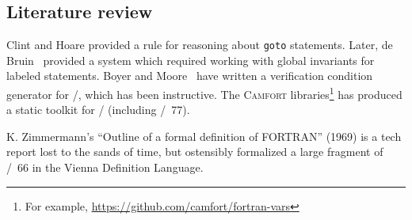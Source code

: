 \subsection{Literature review}
Clint and Hoare provided a rule for reasoning about \texttt{goto}
statements. Later, de Bruin~\cite{deBruin1981goto} provided a system
which required working with global invariants for labeled statements.
Boyer and Moore~\cite{boyer1980vcg} have written a verification
condition generator for \FORTRAN/, which has been instructive.
The \textsc{Camfort} libraries\footnote{For example, \url{https://github.com/camfort/fortran-vars}} has produced a static toolkit for \FORTRAN/
(including \FORTRAN/~77).

K. Zimmermann's ``Outline of a formal deﬁnition of FORTRAN'' (1969) is a
tech report lost to the sands of time, but ostensibly formalized a large
fragment of \FORTRAN/~66 in the Vienna Definition Language.



